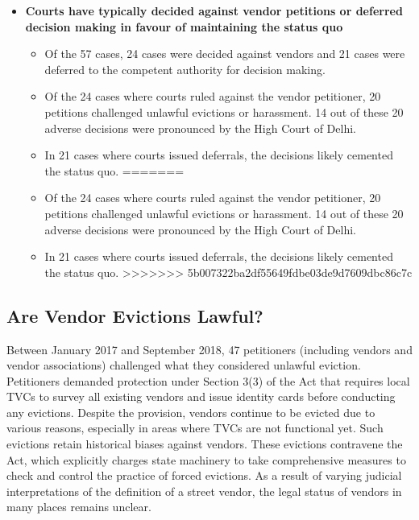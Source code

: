 \documentclass[a4paper, 12pt, twoside]{article}
\begin{document}
{\begin{itemize}[nosep]
\begin{itemize}
\end{itemize}
\end{itemize}

\begin{itemize}
\item \textbf{ Courts have typically decided against vendor petitions or deferred decision making in favour of maintaining the status quo}

\begin{itemize}
<<<<<<< HEAD
\item 	Of the 57 cases, 24 cases were decided against vendors and 21 cases were deferred to the competent authority for decision making.
\item 	Of the 24 cases where courts ruled against the vendor petitioner, 20 petitions challenged unlawful evictions or harassment. 14 out of these 20 adverse decisions were pronounced by the High Court of Delhi.
\item 	In 21 cases where courts issued deferrals, the decisions likely cemented the status quo.
=======
\item Of the 24 cases where courts ruled against the vendor petitioner, 20 petitions challenged unlawful evictions or harassment. 14 out of these 20 adverse decisions were pronounced by the High Court of Delhi.
\item In 21 cases where courts issued deferrals, the decisions likely cemented the status quo.
>>>>>>> 5b007322ba2df55649fdbe03de9d7609dbc86c7c
\end{itemize}
\end{itemize}

\subsection*{Are Vendor Evictions Lawful?}

Between January 2017 and September 2018, 47 petitioners (including vendors and vendor associations) challenged what they considered unlawful eviction. Petitioners demanded protection under Section 3(3) of the Act that requires local TVCs to survey all existing vendors and issue identity cards before conducting any evictions. Despite the provision, vendors continue to be evicted due to various reasons, especially in areas where TVCs are not functional yet. Such evictions retain historical biases against vendors. These evictions contravene the Act, which explicitly charges state machinery to take comprehensive measures to check and control the practice of forced evictions. As a result of varying judicial interpretations of the definition of a street vendor, the legal status of vendors in many places remains unclear.

}
\end{document}
